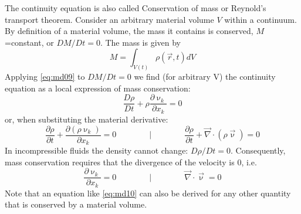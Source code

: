The continuity equation is also called Conservation of mass or 
Reynold’s transport theorem.
Consider an arbitrary material volume $V$ within a continuum. 
By definition of a material
volume, the mass it contains is conserved, $M$=constant, or
$DM/Dt=0$.
The mass is given by
\[
M=\int_{V(t)} \rho(\vec{r},t) dV
\]
Applying \eqref{eq:md09} to $DM/Dt=0$ we find 
(for arbitrary V) the continuity
equation as a local expression of mass conservation:
\begin{equation}
\frac{D\rho}{Dt} + \rho \frac{\partial \upnu_k}{\partial x_k} =0
\label{eq:md10}
\end{equation}
or, when substituting the material derivative:
\begin{equation}
\frac{\partial \rho}{\partial t} + \frac{\partial (\rho \upnu_k)}{\partial x_k} =0
\qquad
\qquad
\bigg\rvert
\qquad
\qquad
\frac{\partial \rho}{\partial t} + \vec\nabla\cdot (\rho \vec\upnu) =0
\end{equation}
In incompressible fluids the density cannot change: $D\rho/Dt=0$.
Consequently, mass
conservation requires that the divergence of the velocity is 0, i.e.
\begin{equation}
\frac{\partial \upnu_k}{\partial x_k} = 0
\qquad
\qquad
\bigg\rvert
\qquad
\qquad
\vec\nabla \cdot \vec\upnu = 0
\end{equation}
Note that an equation like \eqref{eq:md10}
can also be derived for any other quantity that is
conserved by a material volume.


\vspace{0.5cm}
\vspace{0.5cm}

\vspace{0.5cm}



